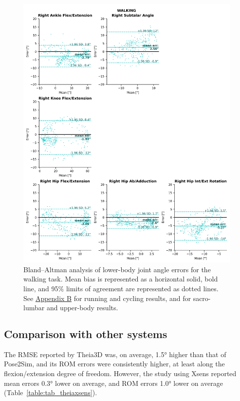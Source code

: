 \begin{figure}[!ht]
	\centering
	\def\svgwidth{1\columnwidth}
	\fontsize{10pt}{10pt}\selectfont
	\includegraphics[width=0.97\linewidth]{"../Chap5/Figures/Fig_BlandWalk.png"}
	\caption{Bland–Altman analysis of lower-body joint angle errors for the walking task. Mean bias is represented as a horizontal solid, bold line, and 95\% limits of agreement are represented as dotted lines. See \hyperref[Ann:2]{Appendix B} for running and cycling results, and for sacro-lumbar and upper-body results.}
	\label{fig_blandwalk}
\end{figure}

\clearpage 

\subsection{Comparison with other systems}

The RMSE reported by Theia3D \cite{Kanko2021b} was, on average, 1.5° higher than that of Pose2Sim, and its ROM errors were consistently higher, at least along the flexion/extension degree of freedom. However, the study using Xsens \cite{Zhang2013} reported mean errors 0.3° lower on average, and ROM errors 1.0° lower on average (Table~\ref{table:tab_theiaxsens}).

